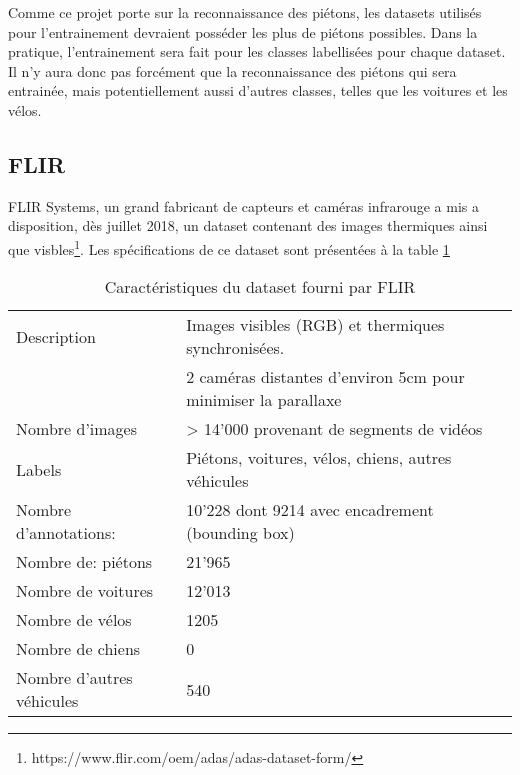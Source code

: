 Comme ce projet porte sur la reconnaissance des piétons, les datasets utilisés pour l'entrainement devraient posséder les plus de piétons possibles. Dans la pratique, l'entrainement sera fait pour les classes labellisées pour chaque dataset. Il n'y aura donc pas forcément que la reconnaissance des piétons qui sera entrainée, mais potentiellement aussi d'autres classes, telles que les voitures et les vélos.

\subsection{FLIR}
FLIR Systems, un grand fabricant de capteurs et caméras infrarouge a mis a disposition, dès juillet 2018, un dataset contenant des images thermiques ainsi que visbles\footnote{https://www.flir.com/oem/adas/adas-dataset-form/}.
Les spécifications de ce dataset sont présentées à la table \ref{tab:dataset-flir}
\begin{table}[h!]
	\begin{center}
		\caption{Caractéristiques du dataset fourni par FLIR}
		\label{tab:dataset-flir}
		\begin{tabular}{p{4.5cm}|p{8cm}}
			Description & Images visibles (RGB) et thermiques synchronisées.\\
			& 2 caméras distantes d'environ 5cm pour minimiser la parallaxe\\
			Nombre d'images & > 14'000 provenant de segments de vidéos\\
			Labels & Piétons, voitures, vélos, chiens, autres véhicules\\
			Nombre d'annotations: & 10'228 dont 9214 avec encadrement (bounding box)\\
			Nombre de: piétons & 21'965 \\
			Nombre de voitures & 12'013\\
			Nombre de vélos & 1205\\
			Nombre de chiens & 0\\
			Nombre d'autres véhicules & 540 \\
		\end{tabular}
	\end{center}
\end{table}

